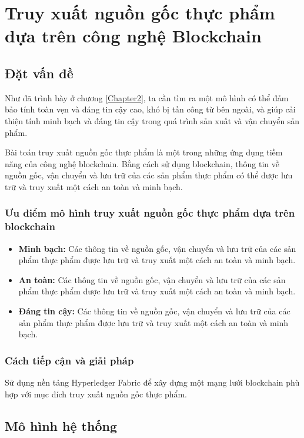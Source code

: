 \chapter{ Truy xuất nguồn gốc thực phẩm dựa trên công nghệ Blockchain}
\section{Đặt vấn đề}

Như đã trình bày ở chương \ref{Chapter2}, ta cần tìm ra một mô hình có thể đảm bảo 
tính toàn vẹn và đáng tin cậy cao, khó bị tấn công từ bên ngoài, và giúp 
cải thiện tính minh bạch và đáng tin cậy trong quá trình sản xuất và vận 
chuyển sản phẩm.  

Bài toán truy xuất nguồn gốc thực phẩm là một trong những ứng dụng tiềm năng của công nghệ 
blockchain. Bằng cách sử dụng blockchain, thông tin về nguồn gốc, vận chuyển và lưu trữ 
của các sản phẩm thực phẩm có thể được lưu trữ và truy xuất một cách an toàn và minh bạch.
\subsection{Ưu điểm mô hình truy xuất nguồn gốc thực phẩm dựa trên blockchain}
 
\begin{itemize}
    \item \textbf{Minh bạch:} Các thông tin về nguồn gốc, vận chuyển và lưu trữ của các sản phẩm 
    thực phẩm được lưu trữ và truy xuất một cách an toàn và minh bạch.
    \item \textbf{An toàn:} Các thông tin về nguồn gốc, vận chuyển và lưu trữ của các sản phẩm 
    thực phẩm được lưu trữ và truy xuất một cách an toàn và minh bạch.
    \item \textbf{Đáng tin cậy:} Các thông tin về nguồn gốc, vận chuyển và lưu trữ của các sản phẩm 
    thực phẩm được lưu trữ và truy xuất một cách an toàn và minh bạch.
\end{itemize}

\subsection{Cách tiếp cận và giải pháp}

Sử dụng nền tảng Hyperledger Fabric để xây dựng một mạng lưới blockchain phù hợp với 
mục đích truy xuất nguồn gốc thực phẩm.

\section{Mô hình hệ thống}
